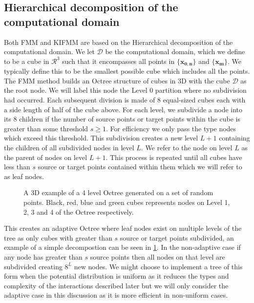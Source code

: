 \subsection{Hierarchical decomposition of the computational domain}
Both FMM and KIFMM are based on the Hierarchical decomposition of the computational domain. We let $\mathcal{D}$ be the computational domain, which we define to be a cube in $\mathcal{R}^3$ such that it encompasses all points in $\{\mathbf{x_{0,n}}\}$ and $\{\mathbf{x_m}\}$. We typically define this to be the smallest possible cube which includes all the points. The FMM method builds an Octree structure of cubes in 3D with the cube $\mathcal{D}$ as the root node. We will label this node the Level $0$ partition where no subdivision had occurred. Each subsequent division is made of $8$ equal-sized cubes each with a side length of half of the cube above. For each level, we subdivide a node into its $8$ children if the number of source points or target points within the cube is greater than some threshold $s\geq 1$. For efficiency we only pass the type nodes which exceed this threshold. This subdivision creates a new level $L+1$ containing the children of all subdivided nodes in level $L$. We refer to the node on level $L$ as the parent of nodes on level $L+1$. This process is repeated until all cubes have less than $s$ source or target points contained within them which we will refer to as leaf nodes.

\begin{figure}[ht]
    \centering
    \resizebox{.6\linewidth}{!}{}
    \caption{A 3D example of a 4 level Octree generated on a set of random points. Black, red, blue and green cubes represents nodes on Level 1, 2, 3 and 4 of the Octree respectively.}
    \label{fig:Decompostionexample}
\end{figure}

This creates an adaptive Octree where leaf nodes exist on multiple levels of the tree as only cubes with greater than $s$ source or target points subdivided, an example of a simple decompostion can be seen in \cref{fig:Decompostionexample}. In the non-adaptive case if any node has greater than $s$ source points then all nodes on that level are subdivided creating $8^L$ new nodes. We might choose to implement a tree of this form when the potential distribution is uniform as it reduces the types and complexity of the interactions described later but we will only consider the adaptive case in this discussion as it is more efficient in non-uniform cases.

